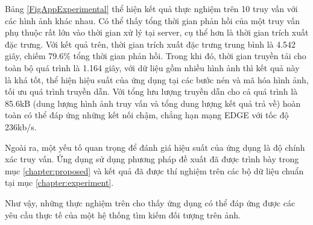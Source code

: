 	Bảng \ref{FigAppExperimental} thể hiện kết quả thực nghiệm trên 10 truy vấn với các hình ảnh khác nhau. Có thể thấy tổng thời gian phản hồi của một truy vấn phụ thuộc rất lớn vào thời gian xử lý tại server, cụ thể hơn là thời gian trích xuất đặc trưng. Với kết quả trên, thời gian trích xuất đặc trưng trung bình là 4.542 giây, chiếm 79.6\% tổng thời gian phản hồi. Trong khi đó, thời gian truyền tải cho toàn bộ quá trình là 1.164 giây, với dữ liệu gồm nhiều hình ảnh thì kết quả này là khá tốt, thể hiện hiệu suất của ứng dụng tại các bước nén và mã hóa hình ảnh, tối ưu quá trình truyền dẫn. Với tổng lưu lượng truyền dẫn cho cả quá trình là 85.6kB (dung lượng hình ảnh truy vấn và tổng dung lượng kết quả trả về) hoàn toàn có thể đáp ứng những kết nối chậm, chẳng hạn mạng EDGE với tốc độ 236kb/s.
	
	Ngoài ra, một yếu tố quan trọng để đánh giá hiệu suất của ứng dụng là độ chính xác truy vấn. Ứng dụng sử dụng phương pháp đề xuất đã được trình bày trong mục \ref{chapter:proposed} và kết quả đã được thí nghiệm trên các bộ dữ liệu chuẩn tại mục \ref{chapter:experiment}. 
	
	Như vậy, những thực nghiệm trên cho thấy ứng dụng có thể đáp ứng được các yêu cầu thực tế của một hệ thống tìm kiếm đối tượng trên ảnh.
